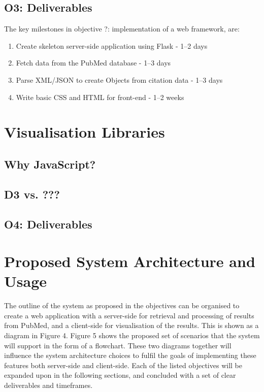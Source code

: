 \documentclass[PROP_AGutteridge_CS.tex]{subfiles}
\begin{document}
\subsection{O3: Deliverables}
The key milestones in objective ?: implementation of a web framework, are:
\begin{enumerate}
\item{Create skeleton server-side application using Flask - 1--2 days} 
\item{Fetch data from the PubMed database - 1--3 days}
\item{Parse XML/JSON to create Objects from citation data - 1--3 days}
\item{Write basic CSS and HTML for front-end - 1--2 weeks}
\end{enumerate}


\section{Visualisation Libraries}
\subsection{Why JavaScript?} 

\subsection{D3 vs. ???}

\subsection{O4: Deliverables}

\section{Proposed System Architecture and Usage}
The outline of the system as proposed in the objectives can be organised to create a web application with a server-side for retrieval and processing of results from PubMed, and a client-side for visualisation of the results. This is shown as a diagram in Figure 4. Figure 5 shows the proposed set of scenarios that the system will support in the form of a flowchart. These two diagrams together will influence the system architecture choices to fulfil the goals of implementing these features both server-side and client-side. Each of the listed objectives will be expanded upon in the following sections, and concluded with a set of clear deliverables and timeframes. 
\end{document}
